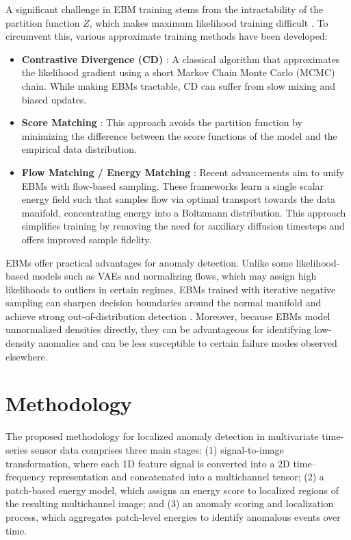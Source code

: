 \documentclass{article}
\begin{document}
A significant challenge in EBM training stems from the intractability of the partition function $Z$, which makes maximum likelihood training difficult \citep{xiao_yan_amit_2021}. To circumvent this, various approximate training methods have been developed: 
\begin{itemize}
\item \textbf{Contrastive Divergence (CD)} \citep{hinton_2012}: A classical algorithm that approximates the likelihood gradient using a short Markov Chain Monte Carlo (MCMC) chain. While making EBMs tractable, CD can suffer from slow mixing and biased updates.
\item \textbf{Score Matching} \citep{zhai_cheng_lu_zhang_2016}: This approach avoids the partition function by minimizing the difference between the score functions of the model and the empirical data distribution.
\item \textbf{Flow Matching / Energy Matching} \citep{balcerak2025energymatchingunifyingflow, loo_adeline_lau_leong_tew_pal_baskaran_ting_phan_2025, lipman_2023}: Recent advancements aim to unify EBMs with flow-based sampling. These frameworks learn a single scalar energy field such that samples flow via optimal transport towards the data manifold, concentrating energy into a Boltzmann distribution. This approach simplifies training by removing the need for auxiliary diffusion timesteps and offers improved sample fidelity.
\end{itemize}

EBMs offer practical advantages for anomaly detection. Unlike some likelihood-based models such as VAEs and normalizing flows, which may assign high likelihoods to outliers in certain regimes, EBMs trained with iterative negative sampling can sharpen decision boundaries around the normal manifold and achieve strong out-of-distribution detection \citep{yoon_jin_noh_park_2023}. Moreover, because EBMs model unnormalized densities directly, they can be advantageous for identifying low-density anomalies and can be less susceptible to certain failure modes observed elsewhere.

\section{Methodology}

The proposed methodology for localized anomaly detection in multivariate time-series sensor data comprises three main stages:
(1) signal-to-image transformation, where each 1D feature signal is converted into a 2D time–frequency representation and concatenated into a multichannel tensor;
(2) a patch-based energy model, which assigns an energy score to localized regions of the resulting multichannel image; and
(3) an anomaly scoring and localization process, which aggregates patch-level energies to identify anomalous events over time.
\end{document}
